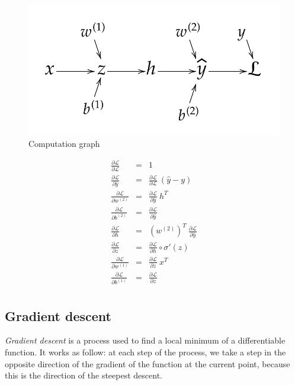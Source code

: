 \documentclass[10pt,a4paper]{article}
\theoremstyle{definition}
\theoremstyle{definition}
\theoremstyle{definition}
\begin{document}
\begin{figure}
\center
\includegraphics[scale=0.5]{computation_graph.png}
\caption{Computation graph}
\end{figure}

\begin{eqnarray*}
\frac{\partial \mathcal{L}}{\partial \mathcal{L}} & = & 1 \\
\frac{\partial \mathcal{L}}{\partial \hat{y}} & = & \frac{\partial \mathcal{L}}{\partial \mathcal{L}} \ (\hat{y} - y) \\
\frac{\partial \mathcal{L}}{\partial w^{(2)}} & = & \frac{\partial \mathcal{L}}{\partial \hat{y}}\ h^T \\
\frac{\partial \mathcal{L}}{\partial b^{(2)}} & = & \frac{\partial \mathcal{L}}{\partial \hat{y}} \\
\frac{\partial \mathcal{L}}{\partial h} & = &  (w^{(2)})^T\ \frac{\partial \mathcal{L}}{\partial \hat{y}} \\
\frac{\partial \mathcal{L}}{\partial z} & = & \frac{\partial \mathcal{L}}{\partial h} \circ \sigma '(z) \\
\frac{\partial \mathcal{L}}{\partial w^{(1)}} & = & \frac{\partial \mathcal{L}}{\partial z}\ x^T \\
\frac{\partial \mathcal{L}}{\partial b^{(1)}} & = & \frac{\partial \mathcal{L}}{\partial z} \\
\end{eqnarray*}

\subsection{Gradient descent}

\textit{Gradient descent} \cite{10} is a process used to find a local minimum of a differentiable function. It works as follow: at each step of the process, we take a step in the opposite direction of the gradient of the function at the current point, because this is the direction of the steepest descent.
\end{document}
